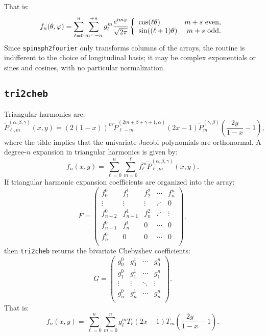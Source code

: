 \documentclass{article}
\def\ii{{\rm i}}
\begin{document}
That is:
\begin{equation}
f_n(\theta,\varphi) = \sum_{\ell=0}^n\sum_{m=-n}^{+n} g_\ell^m \frac{e^{\ii m\varphi}}{\sqrt{2\pi}} \left\{\begin{array}{lr} \cos(\ell\theta) & m+s~{\rm even},\\ \sin((\ell+1)\theta) & m+s~{\rm odd}.\end{array}\right.
\end{equation}
Since {\tt spinsph2fourier} only transforms columns of the arrays, the routine is indifferent to the choice of longitudinal basis; it may be complex exponentials or sines and cosines, with no particular normalization.

\subsection{{\tt tri2cheb}}

Triangular harmonics are:
\begin{equation}
\tilde{P}_{\ell,m}^{(\alpha,\beta,\gamma)}(x,y) = (2(1-x))^m \tilde{P}_{\ell-m}^{(2m+\beta+\gamma+1,\alpha)}(2x-1) \tilde{P}_m^{(\gamma,\beta)}\left(\frac{2y}{1-x}-1\right),
\end{equation}
where the tilde implies that the univariate Jacobi polynomials are orthonormal. A degree-$n$ expansion in triangular harmonics is given by:
\begin{equation}
f_n(x,y) = \sum_{\ell=0}^{n}\sum_{m = 0}^\ell f_\ell^m \tilde{P}_{\ell,m}^{(\alpha,\beta,\gamma)}(x,y).
\end{equation}
If triangular harmonic expansion coefficients are organized into the array:
\begin{equation}
F = \begin{pmatrix}
f_0^0 & f_1^1 & f_2^2 & \cdots & f_n^n\\
\vdots & \vdots &  \vdots & \iddots & 0\\
f_{n-2}^0 & f_{n-1}^1 & f_n^2 & \iddots & \vdots\\
f_{n-1}^0 & f_n^1 & 0 & \cdots & 0\\
f_n^0 & 0 & 0 & \cdots & 0\\
\end{pmatrix},
\end{equation}
then {\tt tri2cheb} returns the bivariate Chebyshev coefficients:
\begin{equation}
G = \begin{pmatrix}
g_0^0 & g_0^1 & \cdots & g_0^n\\
g_1^0 & g_1^1 & \cdots & g_1^n\\
\vdots & \vdots & \ddots & \vdots\\
g_n^0 & g_n^1 & \cdots & g_n^n\\
\end{pmatrix}.
\end{equation}
That is:
\begin{equation}
f_n(x,y) = \sum_{\ell=0}^n\sum_{m=0}^n g_\ell^m T_\ell(2x-1) T_m\left(\frac{2y}{1-x}-1\right).
\end{equation}
\end{document}
